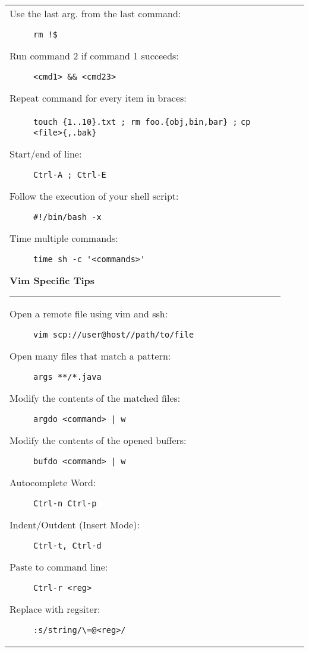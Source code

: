 \documentclass[landscape]{article}
\begin{document}
\begin{tabular*}{10.5in}{|p{2.9in}|p{2.9in}|p{2.9in}|}
\begin{flushleft}
\begin{description}
            \item[Use the last arg. from the last command:]
                {\verb|rm !$|}
            \item[Run command 2 if command 1 succeeds:]
                {\verb!<cmd1> && <cmd23>!}
            \item[Repeat command for every item in braces:]
                {\verb!touch {1..10}.txt ; rm foo.{obj,bin,bar} ;!
                 \verb!cp <file>{,.bak}!}
            \item[Start/end of line:]
                {\verb!Ctrl-A ; Ctrl-E!}
            \item[Follow the execution of your shell script:]
                {\verb|#!/bin/bash -x|}
            \item[Time multiple commands:]
                {\verb!time sh -c '<commands>'!}
        \end{description}
        \textbf{\large{Vim Specific Tips}}
        \rule{2.9in}{.5pt}
        \small
        \begin{description}
            \item[Open a remote file using vim and ssh:]
                {\verb!vim scp://user@host//path/to/file!}
            \item[Open many files that match a pattern:]
                {\verb!args **/*.java!}
            \item[Modify the contents of the matched files:]
                {\verb!argdo <command> | w!}
            \item[Modify the contents of the opened buffers:]
                {\verb!bufdo <command> | w!}
            \item[Autocomplete Word:]
                {\verb!Ctrl-n Ctrl-p!}
            \item[Indent/Outdent (Insert Mode):]
                {\verb!Ctrl-t, Ctrl-d!}
            \item[Paste to command line:]
                {\verb!Ctrl-r <reg>!}
            \item[Replace with regsiter:]
                {\verb!:s/string/\=@<reg>/!}
        \end{description}
    \end{flushleft}
\end{tabular*}
\end{document}
